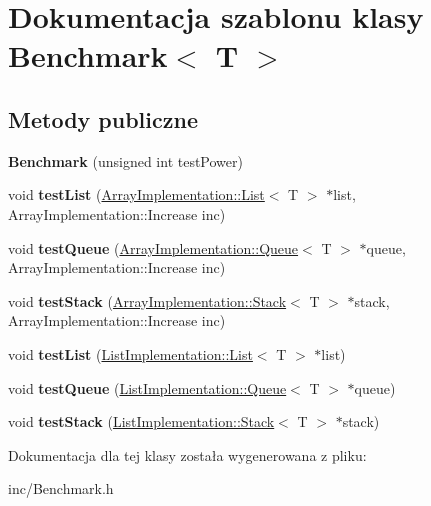 \hypertarget{class_benchmark}{\section{Dokumentacja szablonu klasy Benchmark$<$ T $>$}
\label{class_benchmark}
}
\subsection*{Metody publiczne}
\begin{DoxyCompactItemize}
\item 
\hypertarget{class_benchmark_a4b97a87100461fbeb673bb41127de761}{{\bfseries Benchmark} (unsigned int test\-Power)}\label{class_benchmark_a4b97a87100461fbeb673bb41127de761}

\item 
\hypertarget{class_benchmark_a85a0c6c3181ccbb94f4a5ee46d75d516}{void {\bfseries test\-List} (\hyperlink{class_array_implementation_1_1_list}{Array\-Implementation\-::\-List}$<$ T $>$ $\ast$list, Array\-Implementation\-::\-Increase inc)}\label{class_benchmark_a85a0c6c3181ccbb94f4a5ee46d75d516}

\item 
\hypertarget{class_benchmark_a1087f4569187951c93df6e1faed7fa49}{void {\bfseries test\-Queue} (\hyperlink{class_array_implementation_1_1_queue}{Array\-Implementation\-::\-Queue}$<$ T $>$ $\ast$queue, Array\-Implementation\-::\-Increase inc)}\label{class_benchmark_a1087f4569187951c93df6e1faed7fa49}

\item 
\hypertarget{class_benchmark_a365d3ec0d2cc52dc8e3a9dbb8c4a6a06}{void {\bfseries test\-Stack} (\hyperlink{class_array_implementation_1_1_stack}{Array\-Implementation\-::\-Stack}$<$ T $>$ $\ast$stack, Array\-Implementation\-::\-Increase inc)}\label{class_benchmark_a365d3ec0d2cc52dc8e3a9dbb8c4a6a06}

\item 
\hypertarget{class_benchmark_ad7a4484405fe92bc1c0b91ae170cd847}{void {\bfseries test\-List} (\hyperlink{class_list_implementation_1_1_list}{List\-Implementation\-::\-List}$<$ T $>$ $\ast$list)}\label{class_benchmark_ad7a4484405fe92bc1c0b91ae170cd847}

\item 
\hypertarget{class_benchmark_a3951cc83b8a85da5fd31b6bb7ca647e6}{void {\bfseries test\-Queue} (\hyperlink{class_list_implementation_1_1_queue}{List\-Implementation\-::\-Queue}$<$ T $>$ $\ast$queue)}\label{class_benchmark_a3951cc83b8a85da5fd31b6bb7ca647e6}

\item 
\hypertarget{class_benchmark_a75a11f1d9d4807e96cfa52673affa299}{void {\bfseries test\-Stack} (\hyperlink{class_list_implementation_1_1_stack}{List\-Implementation\-::\-Stack}$<$ T $>$ $\ast$stack)}\label{class_benchmark_a75a11f1d9d4807e96cfa52673affa299}

\end{DoxyCompactItemize}


Dokumentacja dla tej klasy została wygenerowana z pliku\-:\begin{DoxyCompactItemize}
\item 
inc/Benchmark.\-h\end{DoxyCompactItemize}
